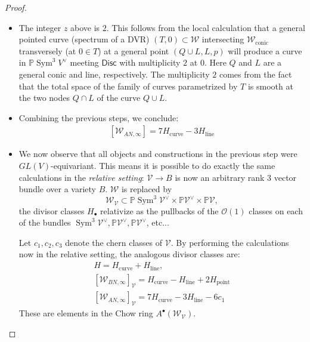 \documentclass[12 pt, reqno]{amsart}
\theoremstyle{definition}
\newcommand{\on}{\operatorname}
\newcommand{\mb}{\mathbb}
\renewcommand{\P}{\mb{P}}
\begin{document}
\begin{proof}
\begin{itemize}
  \item [{\bf Step 4}:] The integer $z$ above is $2$. This follows
    from the local calculation that a general pointed curve (spectrum
    of a DVR) $(T,0) \subset \mathcal{W}$ intersecting
    $\mathcal{W}_{\on{conic}}$ transversely (at $0 \in T$) at a
    general point $(Q \cup L, L, p)$ will produce a curve in
    $\P \on{Sym}^{3}V^{\vee}$ meeting $\mathsf{Disc}$ with
    multiplicity $2$ at $0$. Here $Q$ and $L$ are a general conic and
    line, respectively. The multiplicity $2$ comes from the fact that
    the total space of the family of curves parametrized by $T$ is
    smooth at the two nodes $Q \cap L$ of the curve $Q \cup L$.

  \item [{\bf Step 5}:] Combining the previous steps, we conclude:
    \begin{align}\label{eq:WAN}
      [\mathcal{W}_{AN, \infty}] = 7H_{\on{curve}} - 3H_{\on{line}}
    \end{align}

  \item [{\bf Step 6}:] We now observe that all objects and
    constructions in the previous step were $GL(V)$-equivariant.  This
    means it is possible to do exactly the same calculations in the
    {\sl relative setting}: $\mathcal{V} \to B$ is now an arbitrary
    rank $3$ vector bundle over a variety $B$.  $\mathcal{W}$ is
    replaced by
    \[ \mathcal{W}_{\mathcal{V}} \subset \P
      \on{Sym}^{3}\mathcal{V}^{\vee} \times \P \mathcal{V}^{\vee}
      \times \P \mathcal{V},\] the divisor classes $H_{\bullet}$
    relativize as the pullbacks of the $\mathcal{O}(1)$ classes on
    each of the bundles
    $\on{Sym}^{3}\mathcal{V}^{\vee}, \P \mathcal{V}^{\vee}, \P
    \mathcal{V}^{\vee}$, etc...

    Let $c_{1}, c_{2}, c_{3}$ denote the chern classes of
    $\mathcal{V}$. By performing the calculations now in the relative
    setting, the analogous divisor classes are:
    \begin{align}
      \label{eq:relativeW}
      H = H_{\on{curve}} + H_{\on{line}},\\ 
      [\mathcal{W}_{BN,\infty}]_{\mathcal{V}} = H_{\on{curve}} - H_{\on{line}} + 2H_{\on{point}}\\
      [\mathcal{W}_{AN, \infty}]_{\mathcal{V}} = 7H_{\on{curve}} - 3H_{\on{line}} - 6c_{1}
    \end{align}
    These are elements in the Chow ring
    $A^{\bullet}(\mathcal{W}_{\mathcal{V}})$.


\end{itemize}
\end{proof}
\end{document}
